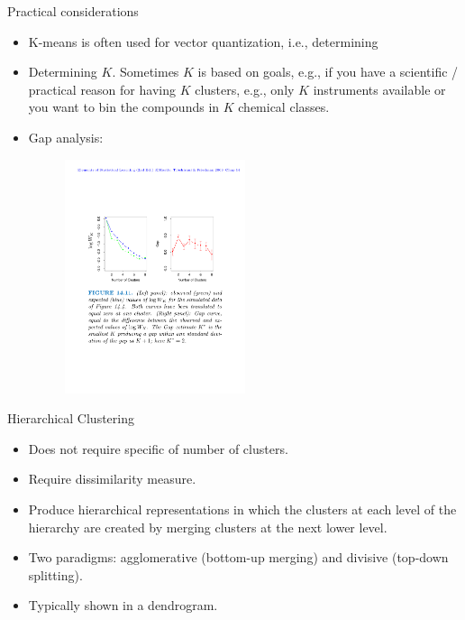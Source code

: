 \documentclass{beamer}
\begin{document}
\begin{frame}{Practical considerations}
    \begin{itemize}
        \item K-means is often used for vector quantization, i.e., determining
        \item Determining $K$. Sometimes $K$ is based on goals, e.g., if you have a scientific / practical reason for having $K$ clusters, e.g., only $K$ instruments available or you want to bin the compounds in $K$ chemical classes.
        \item Gap analysis:
        \begin{figure}
            \centering
            \includegraphics[width=0.5\textwidth]{figures/kmeans-gap-analysis.pdf}
        \end{figure}
    \end{itemize}
\end{frame}


\begin{frame}{Hierarchical Clustering}
    \begin{itemize}
        \item Does not require specific of number of clusters.
        \item Require dissimilarity measure.
        \item Produce hierarchical representations in which the clusters at each level of the hierarchy are created by merging clusters at the next lower level. 
        \item Two paradigms: agglomerative (bottom-up merging) and divisive (top-down splitting).
        \item Typically shown in a dendrogram.
    \end{itemize}
\end{frame}
\end{document}
